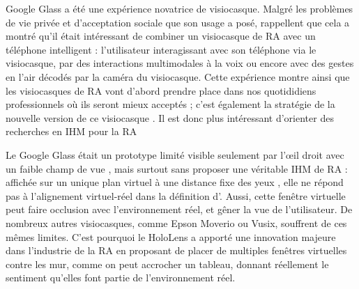 Google Glass a été une expérience novatrice de visiocasque. Malgré les problèmes de vie privée et d'acceptation sociale que son usage a posé, \cite{Koelle2015} rappellent que cela a montré qu'il était intéressant de combiner un visiocasque de RA avec un téléphone intelligent : l'utilisateur interagissant avec son téléphone via le visiocasque, par des interactions multimodales à la voix ou encore avec des gestes en l'air décodés par la caméra du visiocasque. Cette expérience montre ainsi que les visiocasques de RA vont d'abord prendre place dans nos quotididiens professionnels où ils seront mieux acceptés ; c'est également la stratégie de la nouvelle version de ce visiocasque \cite{Levi2017}. Il est donc plus intéressant d'orienter des recherches en IHM pour la RA

Le Google Glass était un prototype limité visible seulement par l'\oe il droit avec un faible champ de vue , mais surtout sans proposer une véritable IHM de RA : affichée sur un unique plan virtuel à une distance fixe des yeux , elle ne répond pas à l'alignement virtuel-réel dans la définition d'\cite{Azuma1997}. Aussi, cette fenêtre virtuelle peut faire occlusion avec l'environnement réel, et gêner la vue de l'utilisateur. De nombreux autres visiocasques, comme Epson Moverio ou Vusix, souffrent de ces mêmes limites. C'est pourquoi le HoloLens a apporté une innovation majeure dans l'industrie de la RA en proposant de placer de multiples fenêtres virtuelles contre les mur, comme on peut accrocher un tableau, donnant réellement le sentiment qu'elles font partie de l'environnement réel.


